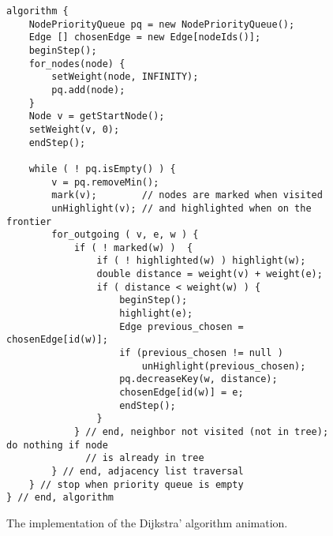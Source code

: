 \begin{figure}

\small
\begin{verbatim}
algorithm {
    NodePriorityQueue pq = new NodePriorityQueue();
    Edge [] chosenEdge = new Edge[nodeIds()]; 
    beginStep();
    for_nodes(node) {
        setWeight(node, INFINITY);
        pq.add(node);
    }
    Node v = getStartNode();
    setWeight(v, 0);
    endStep();

    while ( ! pq.isEmpty() ) {
        v = pq.removeMin();
        mark(v);        // nodes are marked when visited
        unHighlight(v); // and highlighted when on the frontier
        for_outgoing ( v, e, w ) {
            if ( ! marked(w) )  {
                if ( ! highlighted(w) ) highlight(w);
                double distance = weight(v) + weight(e);
                if ( distance < weight(w) ) {
                    beginStep();
                    highlight(e);
                    Edge previous_chosen = chosenEdge[id(w)];
                    if (previous_chosen != null )
                        unHighlight(previous_chosen);
                    pq.decreaseKey(w, distance);
                    chosenEdge[id(w)] = e;
                    endStep();
                }
            } // end, neighbor not visited (not in tree); do nothing if node
              // is already in tree
        } // end, adjacency list traversal
    } // stop when priority queue is empty
} // end, algorithm
\end{verbatim}



\caption{The implementation of the Dijkstra' algorithm animation.}
\label{fig:dijkstra}
\end{figure}
